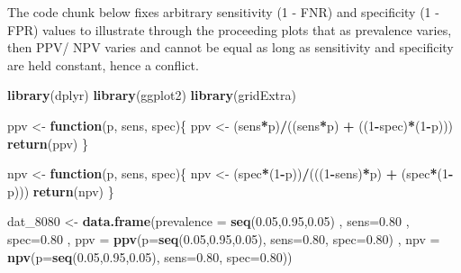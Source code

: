 \documentclass[12pt, twoside]{amherstthesis}
\newenvironment{Shaded}{\begin{snugshade}}{\end{snugshade}}
\newcommand{\AttributeTok}[1]{\textcolor[rgb]{0.13,0.29,0.53}{#1}}
\newcommand{\ControlFlowTok}[1]{\textcolor[rgb]{0.13,0.29,0.53}{\textbf{#1}}}
\newcommand{\DecValTok}[1]{\textcolor[rgb]{0.00,0.00,0.81}{#1}}
\newcommand{\FloatTok}[1]{\textcolor[rgb]{0.00,0.00,0.81}{#1}}
\newcommand{\FunctionTok}[1]{\textcolor[rgb]{0.13,0.29,0.53}{\textbf{#1}}}
\newcommand{\NormalTok}[1]{#1}
\newcommand{\OtherTok}[1]{\textcolor[rgb]{0.56,0.35,0.01}{#1}}
\newcommand{\SpecialCharTok}[1]{\textcolor[rgb]{0.81,0.36,0.00}{\textbf{#1}}}
\begin{document}
\noindent The code chunk below fixes arbitrary sensitivity (1 - FNR) and specificity (1 - FPR) values to illustrate through the proceeding plots that as prevalence varies, then PPV/ NPV varies and cannot be equal as long as sensitivity and specificity are held constant, hence a conflict.
\begin{Shaded}
\begin{Highlighting}[]
\FunctionTok{library}\NormalTok{(dplyr)}
\FunctionTok{library}\NormalTok{(ggplot2)}
\FunctionTok{library}\NormalTok{(gridExtra)}
\end{Highlighting}
\end{Shaded}
\begin{Shaded}
\begin{Highlighting}[]
\NormalTok{ppv }\OtherTok{\textless{}{-}} \ControlFlowTok{function}\NormalTok{(p, sens, spec)\{}
\NormalTok{  ppv }\OtherTok{\textless{}{-}}\NormalTok{ (sens}\SpecialCharTok{*}\NormalTok{p)}\SpecialCharTok{/}\NormalTok{((sens}\SpecialCharTok{*}\NormalTok{p) }\SpecialCharTok{+}\NormalTok{ ((}\DecValTok{1}\SpecialCharTok{{-}}\NormalTok{spec)}\SpecialCharTok{*}\NormalTok{(}\DecValTok{1}\SpecialCharTok{{-}}\NormalTok{p)))}
  \FunctionTok{return}\NormalTok{(ppv)}
\NormalTok{\}}

\NormalTok{npv }\OtherTok{\textless{}{-}} \ControlFlowTok{function}\NormalTok{(p, sens, spec)\{}
\NormalTok{  npv }\OtherTok{\textless{}{-}}\NormalTok{ (spec}\SpecialCharTok{*}\NormalTok{(}\DecValTok{1}\SpecialCharTok{{-}}\NormalTok{p))}\SpecialCharTok{/}\NormalTok{(((}\DecValTok{1}\SpecialCharTok{{-}}\NormalTok{sens)}\SpecialCharTok{*}\NormalTok{p) }\SpecialCharTok{+}\NormalTok{ (spec}\SpecialCharTok{*}\NormalTok{(}\DecValTok{1}\SpecialCharTok{{-}}\NormalTok{p)))}
  \FunctionTok{return}\NormalTok{(npv)}
\NormalTok{\}}

\NormalTok{dat\_8080 }\OtherTok{\textless{}{-}} \FunctionTok{data.frame}\NormalTok{(}\AttributeTok{prevalence =} \FunctionTok{seq}\NormalTok{(}\FloatTok{0.05}\NormalTok{,}\FloatTok{0.95}\NormalTok{,}\FloatTok{0.05}\NormalTok{)}
\NormalTok{                       , }\AttributeTok{sens=}\FloatTok{0.80}
\NormalTok{                       , }\AttributeTok{spec=}\FloatTok{0.80}
\NormalTok{                       , }\AttributeTok{ppv =} \FunctionTok{ppv}\NormalTok{(}\AttributeTok{p=}\FunctionTok{seq}\NormalTok{(}\FloatTok{0.05}\NormalTok{,}\FloatTok{0.95}\NormalTok{,}\FloatTok{0.05}\NormalTok{), }
                                   \AttributeTok{sens=}\FloatTok{0.80}\NormalTok{, }
                                   \AttributeTok{spec=}\FloatTok{0.80}\NormalTok{)}
\NormalTok{                       , }\AttributeTok{npv =} \FunctionTok{npv}\NormalTok{(}\AttributeTok{p=}\FunctionTok{seq}\NormalTok{(}\FloatTok{0.05}\NormalTok{,}\FloatTok{0.95}\NormalTok{,}\FloatTok{0.05}\NormalTok{), }
                                   \AttributeTok{sens=}\FloatTok{0.80}\NormalTok{, }
                                   \AttributeTok{spec=}\FloatTok{0.80}\NormalTok{))}


\end{Highlighting}
\end{Shaded}
\end{document}
